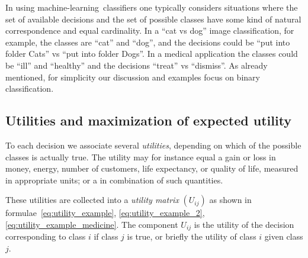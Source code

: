 \documentclass[\ifafour a4paper,12pt,\else a5paper,10pt,\fi%
onecolumn,oneside,article,%
british%
]{memoir}
\theoremstyle{remark}
\theoremstyle{innote}
\newcommand*{\mathte}[1]{\textbf{\textit{\textsf{#1}}}}
\renewcommand*{\|}[1][]{\nonscript\:#1\vert\nonscript\:\mathopen{}}
\newcommand*{\ml}{machine-learning}
\newcommand*{\U}{\mathrm{u}}
\newcommand*{\nd}{n_{\textrm{d}}}
\newcommand*{\nc}{n_{\textrm{c}}}
\begin{document}
In using \ml\ classifiers one typically considers situations where the set of available decisions and the set of possible classes have some kind of natural correspondence and equal cardinality. In a \enquote{cat vs dog} image classification, for example, the classes are \enquote{cat} and \enquote{dog}, and the decisions could be \enquote{put into folder Cats} vs \enquote{put into folder Dogs}. In a medical application the classes could be \enquote{ill} and \enquote{healthy} and the decisions \enquote{treat} vs \enquote{dismiss}. As already mentioned, for simplicity our discussion and examples focus on binary classification.


\subsection{Utilities and maximization of expected utility}
\label{sec:dt_utilities}

To each decision we associate several \emph{utilities}, depending on which of the possible classes is actually true. The utility may for instance equal a gain or loss in money, energy, number of customers, life expectancy, or quality of life, measured in appropriate units; or a in combination of such quantities.

These utilities are collected into a \emph{utility matrix} $(U_{ij})$ as shown in formulae~\eqref{eq:utility_example}, \eqref{eq:utility_example_2}, \eqref{eq:utility_example_medicine}.
The component $U_{ij}$ is the utility of the decision corresponding to class $i$ if class $j$ is true, or briefly the utility of class $i$ given class $j$.
\end{document}

